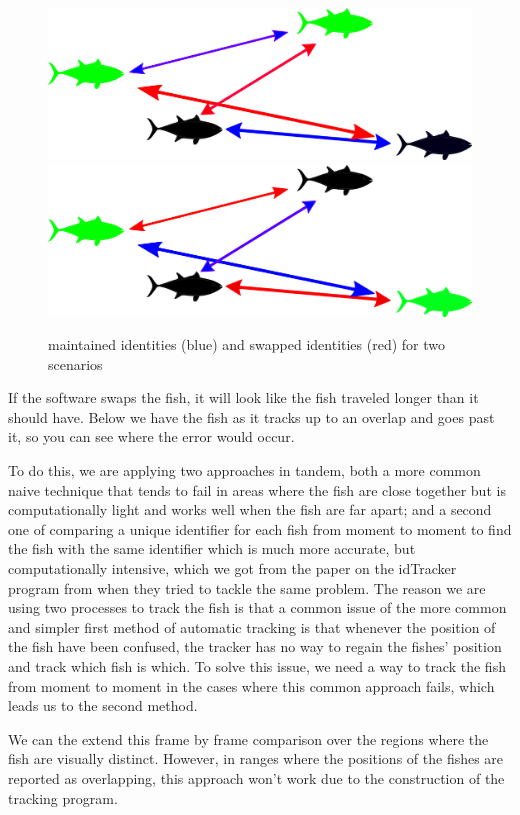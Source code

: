 \documentclass{article}
\begin{document}

\begin{figure}[H]
	\centering
	\includegraphics[width=.49\linewidth]{fish3}
	\includegraphics[width=.49\linewidth]{fish4}
	\caption{maintained identities (blue) and swapped identities (red) for two scenarios}
	\label{fig:broverlap}
\end{figure}


If the software swaps the fish, it will look like the fish traveled longer than it should have. Below we have the fish as it tracks up to an overlap and goes past it, so you can see where the error would occur.

To do this, we are applying two approaches in tandem, both a more common naive technique that tends to fail in areas where the fish are close together but is computationally light and works well when the fish are far apart; and a second one of comparing a unique identifier for each fish from moment to moment to find the fish with the same identifier which is much more accurate, but computationally intensive, which we got from the paper on the idTracker program from when they tried to tackle the same problem. The reason we are using two processes to track the fish is that a common issue of the more common and simpler first method of automatic tracking is that whenever the position of the fish have been confused, the tracker has no way to regain the fishes' position and track which fish is which. To solve this issue, we need a way to track the fish from moment to moment in the cases where this common approach fails, which leads us to the second method.

We can the extend this frame by frame comparison over the regions where the fish are visually distinct. However, in ranges where the positions of the fishes are reported as overlapping, this approach won't work due to the construction of the tracking program. 
\end{document}
